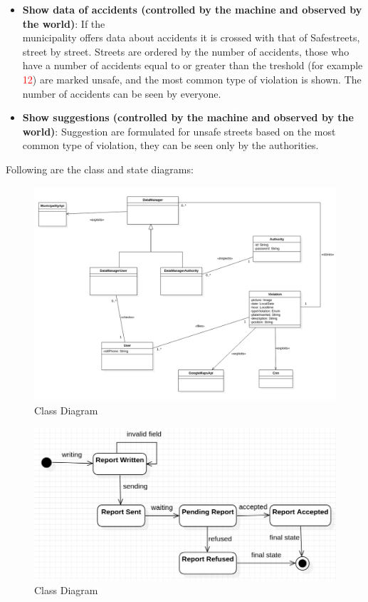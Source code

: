 \begin{itemize}
\item \textbf{Show data of accidents (controlled by the machine and observed by the world)}: If the \\ municipality offers data about accidents it is crossed with that of Safestreets, street by street. Streets are ordered by the number of accidents, those who have a number of accidents equal to or greater than the treshold (for example \textcolor{Red}{12}) are marked unsafe, and the most common type of violation is shown. The number of accidents can be seen by everyone.

\item \textbf{Show suggestions (controlled by the machine and observed by the world)}: Suggestion are formulated for unsafe streets based on the most common type of violation, they can be seen only by the authorities.

\end{itemize}

Following are the class and state diagrams: \newpage


\begin{figure}
\centering
\includegraphics[width=\textwidth]{Images/Diagrams/uml.png}
\caption{\label{fig:UML}Class Diagram}
\end{figure}

\begin{figure}
\centering
\includegraphics[width=\textwidth]{Images/Diagrams/State-1.png}
\caption{\label{fig:UML}Class Diagram}
\end{figure}

